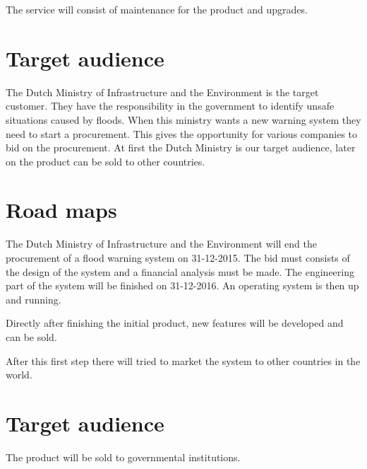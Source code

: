 The service will consist of maintenance for the product and upgrades.

\section{Target audience}
The Dutch Ministry of Infrastructure and the Environment is the target customer. They have the responsibility in the government to identify unsafe situations caused by floods. When this ministry wants a new warning system they need to start a procurement. This gives the opportunity for various companies to bid on the procurement. At first the Dutch Ministry is our target audience, later on the product can be sold to other countries.


\section{Road maps}
The Dutch Ministry of Infrastructure and the Environment will end the procurement of a flood warning system on 31-12-2015. The bid must consists of the design of the system and a financial analysis must be made. The engineering part of the system will be finished on 31-12-2016. An operating system is then up and running.

Directly after finishing the initial product, new features will be developed and can be sold.

After this first step there will tried to market the system to other countries in the world. 

\section{Target audience}
The product will be sold to governmental institutions. 

